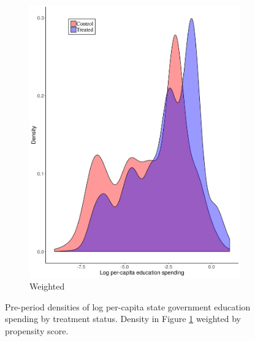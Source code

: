 \documentclass[hidelinks,12pt]{article}
\begin{document}
\begin{appendices}
\begin{figure}[htbp]
\begin{subfigure}[t]{0.48\textwidth}
		\includegraphics[width=\textwidth]{plots/educ-dens-w.png}
		\caption{Weighted\label{educ-dense-w}}
	\end{subfigure}
	\caption{Pre-period densities of log per-capita state government education spending by treatment status. Density in Figure \ref{educ-dense-w} weighted by propensity score. \label{educ-dense}} 
\end{figure}




\end{appendices}
\end{document}
